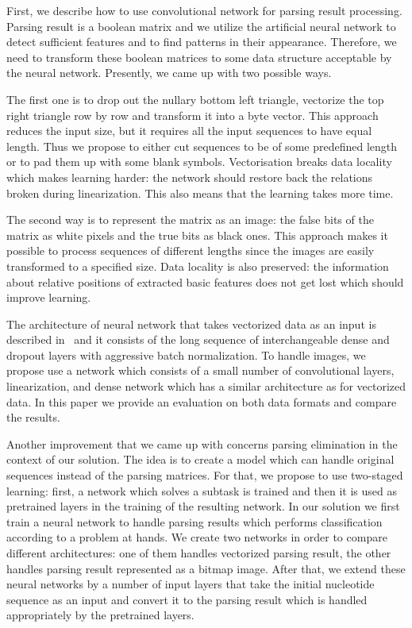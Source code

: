 \documentclass[runningheads]{llncs}
\begin{document}
First, we describe how to use convolutional network for parsing result processing. Parsing result is a boolean matrix and we utilize the artificial neural network to detect sufficient features and to find patterns in their appearance.
Therefore, we need to transform these boolean matrices to some data structure acceptable by the neural network.
Presently, we came up with two possible ways.

The first one is to drop out the nullary bottom left triangle, vectorize the top right triangle row by row and transform it into a byte vector.
This approach reduces the input size, but it requires all the input sequences to have equal length.
Thus we propose to either cut sequences to be of some predefined length or to pad them up with some blank symbols.
Vectorisation breaks data locality which makes learning harder: the network should restore back the relations broken during linearization.
This also means that the learning takes more time.

The second way is to represent the matrix as an image: the false bits of the matrix as white pixels and the true bits as black ones.
This approach makes it possible to process sequences of different lengths since the images are easily transformed to a specified size.
Data locality is also preserved: the information about relative positions of extracted basic features does not get lost which should improve learning.

The architecture of neural network that takes vectorized data as an input is described in~\cite{grigorevcomposition} and it consists of the long sequence of interchangeable dense and dropout layers with aggressive batch normalization. To handle images, we propose use a network which consists of a small number of convolutional layers, linearization, and dense network which has a similar architecture as for vectorized data.
In this paper we provide an evaluation on both data formats and compare the results.

Another improvement that we came up with concerns parsing elimination in the context of our solution. The idea is to create a model which can handle original sequences instead of the parsing matrices. For that, we propose to use two-staged learning: first, a network which solves a subtask is trained and then it is used as pretrained layers in the training of the resulting network.
In our solution we first train a neural network to handle parsing results which performs classification according to a problem at hands. We create two networks in order to compare different architectures: one of them handles vectorized parsing result, the other handles parsing result represented as a bitmap image. After that, we extend these neural networks by a number of input layers that take the initial nucleotide sequence as an input and convert it to the parsing result which is handled appropriately by the pretrained layers.
\end{document}
